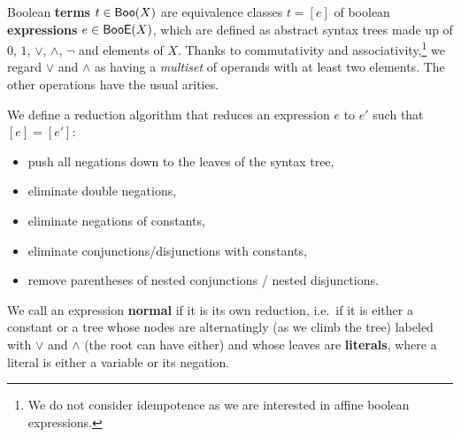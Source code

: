 \documentclass[a4paper]{memoir}
\begin{document}
\begin{definition} \label{def:bool:reduction}
	Boolean \textbf{terms} $t \in \mathsf{Boo}(X)$ are equivalence classes $t = [e]$ of boolean \textbf{expressions} $e \in \mathsf{BooE}(X)$, which are defined as abstract syntax trees made up of $0$, $1$, $\vee$, $\wedge$, $\lnot$ and elements of $X$. Thanks to commutativity and associativity,\footnote{We do not consider idempotence as we are interested in affine boolean expressions.} we regard $\vee$ and $\wedge$ as having a \emph{multiset} of operands with at least two elements. The other operations have the usual arities.
	
	We define a reduction algorithm that reduces an expression $e$ to $e'$ such that $[e] = [e']$:
	\begin{itemize}
		\item push all negations down to the leaves of the syntax tree,
    		\item eliminate double negations,
    		\item eliminate negations of constants,
    		\item eliminate conjunctions/disjunctions with constants,
    		\item remove parentheses of nested conjunctions / nested disjunctions.
	\end{itemize}
	We call an expression \textbf{normal} if it is its own reduction, i.e.\ if it is either a constant or a tree whose nodes are alternatingly (as we climb the tree) labeled with $\vee$ and $\wedge$ (the root can have either) and whose leaves are \textbf{literals}, where a literal is either a variable or its negation.
\end{definition}
\end{document}
